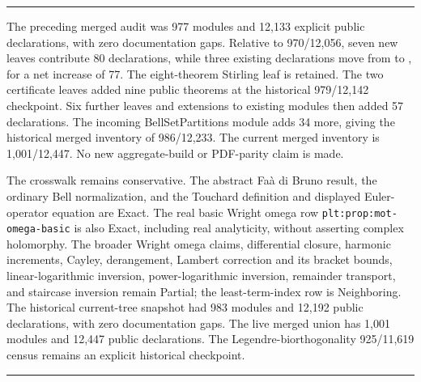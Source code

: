 \documentclass[11pt,oneside]{article}
\theoremstyle{definition}
\theoremstyle{remark}
\newenvironment{boxedremark}{%
  \par\smallskip\noindent\begin{center}\begin{minipage}{0.94\textwidth}%
  \color{black}\hrule\vspace{0.6em}\small
}{%
  \vspace{0.6em}\hrule\end{minipage}\end{center}\smallskip
}
\begin{document}
\begin{boxedremark}
The preceding merged audit was 977 modules and 12,133 explicit public
declarations, with zero documentation gaps.  Relative to 970/12,056, seven
new leaves contribute 80 declarations, while three existing declarations
move from  to ,
for a net increase of 77.  The eight-theorem Stirling leaf is retained.
The two certificate leaves added nine public theorems at the historical
979/12,142 checkpoint. Six further leaves and extensions to existing modules
then added 57 declarations. The incoming BellSetPartitions module adds 34
more, giving the historical merged inventory of 986/12,233. The current merged
inventory is 1,001/12,447. No new aggregate-build
or PDF-parity claim is made.

The crosswalk remains conservative.  The abstract Fa\`a di Bruno result, the
ordinary Bell normalization, and the Touchard definition and displayed
Euler-operator equation are Exact.  The real basic Wright omega row
\nolinkurl{plt:prop:mot-omega-basic} is also Exact, including real analyticity,
without asserting complex holomorphy.  The broader Wright omega claims,
differential closure,
harmonic increments, Cayley, derangement, Lambert correction and its bracket
bounds, linear-logarithmic inversion, power-logarithmic inversion, remainder
transport, and staircase inversion remain Partial; the least-term-index row
is Neighboring.  The historical current-tree snapshot had 983 modules and
12,192 public declarations, with zero documentation gaps.  The live merged
union has 1,001 modules and 12,447 public declarations.  The
Legendre-biorthogonality 925/11,619 census remains an explicit historical
checkpoint.
\end{boxedremark}
\end{document}
